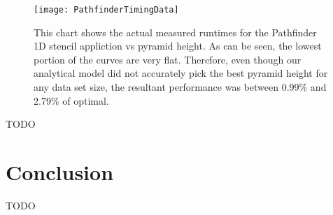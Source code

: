 \documentclass{styles/sig-alternate}
\begin{document}
\begin{figure}
\texttt{[image: PathfinderTimingData]}
\caption{This chart shows the actual measured runtimes for the Pathfinder 1D stencil appliction vs pyramid height.
As can be seen, the lowest portion of the curves are very flat.  Therefore, even though our analytical model did not 
accurately pick the best pyramid height for any data set size, the resultant performance was between 0.99\% and 2.79\% of optimal.}
\label{fig:pathfinder}
\end{figure}

TODO

\section{Conclusion}

TODO

\balance


\end{document}
